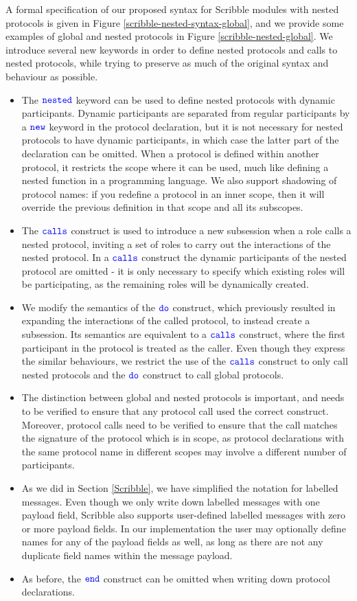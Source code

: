 \documentclass[12pt,twoside]{report}
\begin{document}
A formal specification of our proposed syntax for Scribble modules with nested protocols is given in Figure \ref{scribble-nested-syntax-global}, and we provide some examples of global and nested protocols in Figure \ref{scribble-nested-global}. We introduce several new keywords in order to define nested protocols and calls to nested protocols, while trying to preserve as much of the original syntax and behaviour as possible.
\begin{itemize}
    \item The ${\color{blue}\mathtt{nested}}$ keyword can be used to define nested protocols with dynamic participants. Dynamic participants are separated from regular participants by a ${\color{blue}\mathtt{new}}$ keyword in the protocol declaration, but it is not necessary for nested protocols to have dynamic participants, in which case the latter part of the declaration can be omitted. When a protocol is defined within another protocol, it restricts the scope where it can be used, much like defining a nested function in a programming language. We also support shadowing of protocol names: if you redefine a protocol in an inner scope, then it will override the previous definition in that scope and all its subscopes.
    \item The ${\color{blue}\mathtt{calls}}$ construct is used to introduce a new subsession when a role calls a nested protocol, inviting a set of roles to carry out the interactions of the nested protocol. In a ${\color{blue}\mathtt{calls}}$ construct the dynamic participants of the nested protocol are omitted - it is only necessary to specify which existing roles will be participating, as the remaining roles will be dynamically created.
    \item We modify the semantics of the ${\color{blue}\mathtt{do}}$ construct, which previously resulted in expanding the interactions of the called protocol, to instead create a subsession. Its semantics are equivalent to a ${\color{blue}\mathtt{calls}}$ construct, where the first participant in the protocol is treated as the caller. Even though they express the similar behaviours, we restrict the use of the ${\color{blue}\mathtt{calls}}$ construct to only call nested protocols and the ${\color{blue}\mathtt{do}}$ construct to call global protocols. 
    \item The distinction between global and nested protocols is important, and needs to be verified to ensure that any protocol call used the correct construct. Moreover, protocol calls need to be verified to ensure that the call matches the signature of the protocol which is in scope, as protocol declarations with the same protocol name in different scopes may involve a different number of participants.
    \item As we did in Section \ref{Scribble}, we have simplified the notation for labelled messages. Even though we only write down labelled messages with one payload field, Scribble also supports user-defined labelled messages with zero or more payload fields. In our implementation the user may optionally define names for any of the payload fields as well, as long as there are not any duplicate field names within the message payload.
    \item As before, the ${\color{blue}\mathtt{end}}$ construct can be omitted when writing down protocol declarations.
\end{itemize}
\end{document}
